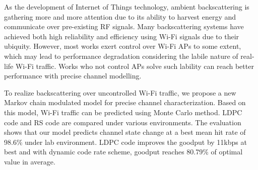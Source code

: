 \begin{enabstract}
%
As the development of Internet of Things technology, ambient backscattering is gathering more and
more attention due to its ability to harvest energy and communicate over pre-existing RF signals.
Many backscattering systems have achieved both high reliability and efficiency using Wi-Fi signals due to 
their ubiquity. However, most works exert control over Wi-Fi APs to some extent, which may lead to performance 
degradation considering the labile nature of real-life Wi-Fi traffic. Works who not control APs solve such lability can 
reach better performance with precise channel modelling.

To realize backscattering over uncontrolled Wi-Fi traffic, we propose a new Markov chain modulated model for precise channel characterization. Based on this model, Wi-Fi traffic can be predicted using Monte Carlo method. LDPC code and RS code are compared under various environments. The evaluation shows that our model predicts channel state change at a best mean hit rate of 98.6\% under lab environment. LDPC code improves the goodput by 11kbps at best and with dynamic code rate scheme, goodput reaches 80.79\% of optimal value in average.
\end{enabstract}
